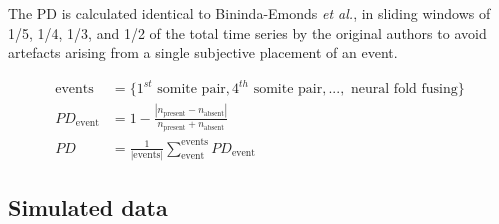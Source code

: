 The PD is calculated identical to Bininda-Emonds \textit{et al.},  in sliding windows of 1/5, 1/4, 1/3, and 1/2 of the total time series by the original authors to avoid artefacts arising from a single subjective placement of an event. 

\begin{align*}\label{eq:phenotypicdivergence}
    \text{events} &= \{1^{st}\text{ somite pair}, 4^{th}\text{ somite pair}, ...,\text{ neural fold fusing}\} \\ 
    PD_{\text{event}} &= 1 - \frac{|n_{\text{present}} - n_{\text{absent}}|}{n_{\text{present}} + n_{\text{absent}}} \\
    PD &= \frac{1}{|\text{events}|} \sum_{\text{event}}^{\text{events}} PD_{\text{event}}
\end{align*}

\subsection{Simulated data}

